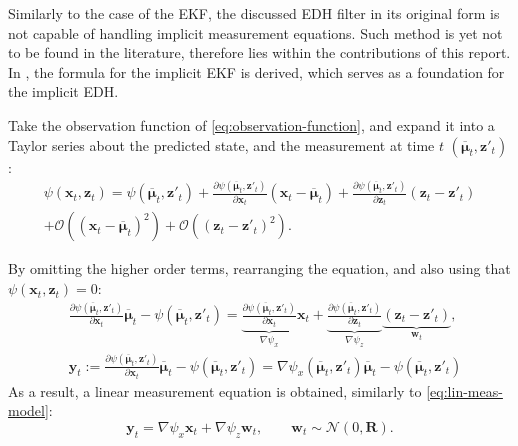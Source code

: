Similarly to the case of the EKF, the discussed EDH filter in its original form is not capable of
handling implicit measurement equations.
Such method is yet not to be found in the literature, therefore lies within the contributions
of this report. In \cite{Zhang2012}, the formula for the implicit EKF is derived,
which serves as a foundation for the implicit EDH.

Take the observation function of \eqref{eq:observation-function},
and expand it into a Taylor series about the predicted state, and the measurement at time $t$ $\left(\overline{\boldsymbol\mu}_t,\mathbf{z}'_t\right)$:
\begin{align}
    \psi(\mathbf{x}_t,\mathbf{z}_t) = \psi(\overline{\boldsymbol\mu}_t,\mathbf{z}'_t)
    + \frac{\partial \psi(\overline{\boldsymbol\mu}_t,\mathbf{z}'_t)}{\partial \mathbf{x}_t}(\mathbf{x}_t-\overline{\boldsymbol\mu}_t)
    + \frac{\partial \psi(\overline{\boldsymbol\mu}_t,\mathbf{z}'_t)}{\partial \mathbf{z}_t}(\mathbf{z}_t-\mathbf{z}'_t) \\
    + \mathcal{O}((\mathbf{x}_t-\overline{\boldsymbol\mu}_t)^2)
    + \mathcal{O}((\mathbf{z}_t-\mathbf{z}'_t)^2) \nonumber.
\end{align}

By omitting the higher order terms, rearranging the equation, and also using that \linebreak
$\psi(\mathbf{x}_t,\mathbf{z}_t) = 0$:
\begin{align}
     & \frac{\partial \psi(\overline{\boldsymbol\mu}_t,\mathbf{z}'_t)}{\partial \mathbf{x}_t}\overline{\boldsymbol\mu}_t
    - \psi(\overline{\boldsymbol\mu}_t,\mathbf{z}'_t) = \underbrace{\frac{\partial \psi(\overline{\boldsymbol\mu}_t,\mathbf{z}'_t)}{\partial \mathbf{x}_t}}_{\nabla \psi_x}\mathbf{x}_t + \underbrace{\frac{\partial \psi(\overline{\boldsymbol\mu}_t,\mathbf{z}'_t)}{\partial \mathbf{z}_t}}_{\nabla \psi_z}\underbrace{(\mathbf{z}_t-\mathbf{z}'_t)}_{\mathbf{w}_t}, \\
     & \mathbf{y}_t :=  \frac{\partial \psi(\overline{\boldsymbol\mu}_t,\mathbf{z}'_t)}{\partial \mathbf{x}_t}\overline{\boldsymbol\mu}_t
    - \psi(\overline{\boldsymbol\mu}_t,\mathbf{z}'_t) = \nabla\psi_x(\overline{\boldsymbol\mu}_t,\mathbf{z}'_t)\overline{\boldsymbol\mu}_t-\psi(\overline{\boldsymbol\mu}_t,\mathbf{z}'_t) \label{eq:edh-implicit-y}
\end{align}
As a result, a linear measurement equation is obtained, similarly to \eqref{eq:lin-meas-model}:
\begin{equation}
    \mathbf{y}_t = \nabla \psi_x \mathbf{x}_t + \nabla \psi_z\mathbf{w}_t,\quad\quad \mathbf{w}_t \sim \mathcal{N}(0,\mathbf{R}).
\end{equation}

